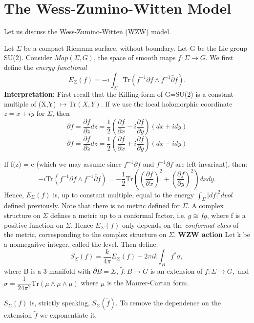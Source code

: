 \section{The Wess-Zumino-Witten Model}
Let us discuss the Wess-Zumino-Witten (WZW) model.
\begin{definition}
 Let $\Sigma$ be a compact Riemann surface, without boundary. Let G be the Lie group SU(2). 
 Consider $Map(\Sigma, G)$, the space of smooth maps $f:\Sigma \rightarrow G$.
 We first define the \textit{energy functional} 
    \begin{equation*}
     E_{\Sigma} (f) = -i\int_{\Sigma} \mathrm{Tr}\left(f^{-1}\partial f\wedge f^{-1} \bar{\partial} f\right).
    \end{equation*}
\textbf{Interpretation:}
First recall that the Killing form of G=SU(2) is a constant multiple of (X,Y) $\mapsto \mathrm{Tr}(X,Y)$.
If we use the local holomorphic coordinate $z = x+iy$ for $\Sigma$, then
\begin{equation*}
 \partial f = \dfrac{\partial f}{\partial z} dz = \dfrac{1}{2}\left( \dfrac{\partial f}{\partial x} - i \dfrac{\partial f}{\partial y}
 \right) (dx+ idy)
\end{equation*}
\begin{equation*}
 \bar{\partial} f = \dfrac{\partial f}{\partial z} dz = \dfrac{1}{2}\left( \dfrac{\partial f}{\partial x} +
 i \dfrac{\partial f}{\partial y}
 \right) (dx - idy)
\end{equation*}
\end{definition}
If f(z) = e (which we may assume since $f^{-1}\partial f $ and  $ f^{-1} \bar{\partial} f$ are left-invariant),
then: 
\begin{equation*}
 -i\mathrm{Tr}(f^{-1}\partial f\wedge f^{-1} \bar{\partial} f) = -\frac{1}{2}
 \mathrm{Tr}\left(\left(\dfrac{\partial f}{\partial x}\right)^{2} + \left(\dfrac{\partial f}{\partial y}\right)^{2} \right) dxdy.
\end{equation*}
Hence, $E_{\Sigma}(f)$ is, up to constant multiple, equal to the energy $\int_{\Sigma} |df|^{2}dvol$ defined 
previously.
Note that there is no metric defined for $\Sigma$. A complex structure on $\Sigma$ defines a metric up to a 
conformal
factor, i.e. $g \cong fg$, where f is a positive function on $\Sigma$. Hence $E_{\Sigma}(f)$ only depends on the
\textit{
conformal class} of the metric, corresponding to the complex structure on $\Sigma$.
\textbf{WZW action} Let k be a nonnegaitve integer, called the level. Then define:
\begin{equation*}
 S_{\Sigma}(f) = \dfrac{k}{4\pi} E_{\Sigma}(f) - 2\pi i k \int_{B} \tilde{f^{*}}\sigma ,
\end{equation*}
where B is a 3-manifold with $\partial B = \Sigma$, $\tilde{f}: B \rightarrow G$ is an extension of
$f:\Sigma \rightarrow
G,$ and $\sigma = \dfrac{1}{24 \pi^{2}} \mathrm{Tr}(\mu \wedge \mu \wedge \mu)$ where $\mu$ is the Maurer-Cartan
form.
\begin{remark}
 $S_{\Sigma}(f)$ is, strictly speaking, $S_{\Sigma}(\tilde{f})$. To remove the dependence on the extension 
 $\tilde{f}$  
 we exponentiate it. 
\end{remark}
